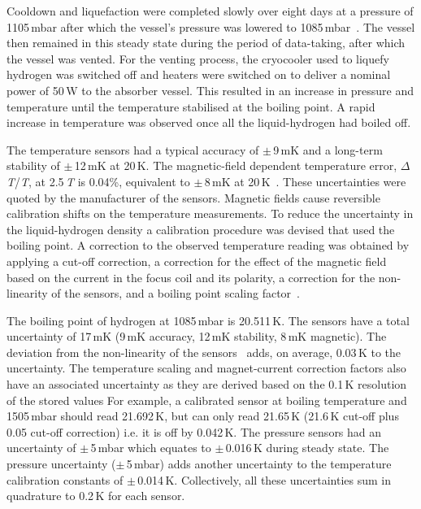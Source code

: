 Cooldown and liquefaction were completed slowly over eight days at a
pressure of 1105\,mbar after which the vessel's pressure was lowered to
1085\,mbar~\cite{1748-0221-13-09-T09008}.
The vessel then remained in this steady state during the period of data-taking, after which the vessel was vented. For the venting process,
the cryocooler used to liquefy hydrogen was
switched off and heaters were switched on to deliver a nominal power
of 50\,W to the absorber vessel.
This resulted in an increase in pressure and temperature until the
temperature stabilised at the boiling point.
A rapid increase in temperature was observed once all the
liquid-hydrogen had boiled off. 

The temperature sensors had a typical accuracy of
$\mathrm{\pm}$\,9\,mK and a long-term stability of
$\mathrm{\pm}$\,12\,mK at 20\,K.
The magnetic-field dependent temperature error, $\Delta$\textit{T}/\textit{T}, at 2.5\,\textit{T} is 0.04\%,
equivalent to $\mathrm{\pm}$\,8\,mK at
20\,K~\cite{TemperatureMeasurement}.
These uncertainties were quoted by the manufacturer of the sensors.
Magnetic fields cause reversible calibration shifts on the temperature
measurements.
To reduce the uncertainty in the liquid-hydrogen density a calibration
procedure was devised that used the boiling point.
A correction to the observed temperature reading was obtained by
applying a cut-off correction, a correction for the effect of the
magnetic field based on the current in the focus coil and its
polarity, a correction for the non-linearity of the sensors, and a 
boiling point scaling factor~\cite{NOTE524}.  
 
The boiling point of hydrogen at 1085\,mbar is 20.511\,K.
The sensors have a total uncertainty of 17\,mK (9\,mK accuracy, 12\,mK
stability, 8\,mK magnetic).
The deviation from the non-linearity of the sensors~\cite{TemperatureMeasurement} adds, on average,
0.03\,K to the uncertainty.
The temperature scaling and magnet-current correction factors also
have an associated uncertainty as they are derived based on the 0.1\,K resolution of the stored values
For example, a calibrated sensor at boiling temperature and 1505\,mbar
should read 21.692\,K, but can only read 21.65\,K (21.6\,K cut-off
plus 0.05 cut-off correction) i.e. it is off by 0.042\,K.
The pressure sensors had an uncertainty of $\mathrm{\pm}$\,5\,mbar
which equates to $\mathrm{\pm}$\,0.016\,K during steady state.
The pressure uncertainty ($\mathrm{\pm}$\,5\,mbar) adds another
uncertainty to the temperature calibration constants of
$\mathrm{\pm}$\,0.014\,K.
Collectively, all these uncertainties sum in quadrature to 0.2\,K for
each sensor.
 
